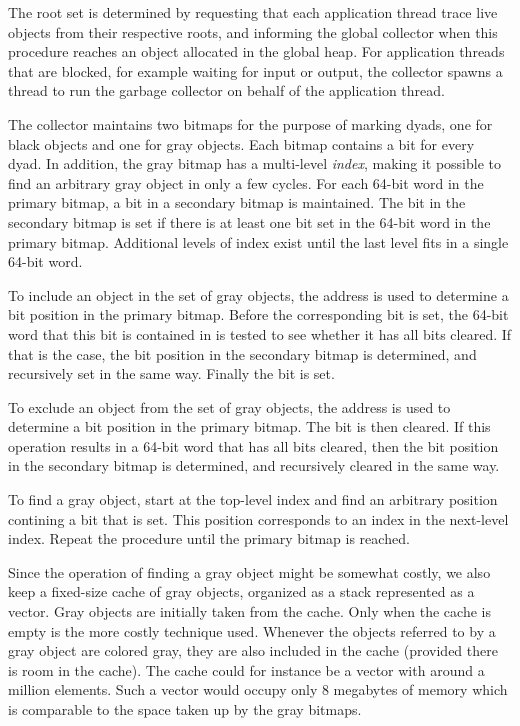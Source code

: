 The root set is determined by requesting that each application thread
trace live objects from their respective roots, and informing the
global collector when this procedure reaches an object allocated in
the global heap. For application threads that are blocked, for example
waiting for input or output, the collector spawns a thread to
run the garbage collector on behalf of the application thread.

The collector maintains two bitmaps for the purpose of marking
dyads, one for black objects and one for gray objects.  Each bitmap
contains a bit for every dyad.  In addition, the gray bitmap has a
multi-level \emph{index}, making it possible to find an arbitrary gray
object in only a few cycles.  For each 64-bit word in the primary
bitmap, a bit in a secondary bitmap is maintained.  The bit in the
secondary bitmap is set if there is at least one bit set in the 64-bit
word in the primary bitmap.  Additional levels of index exist until
the last level fits in a single 64-bit word.

To include an object in the set of gray objects, the address is used
to determine a bit position in the primary bitmap.  Before the
corresponding bit is set, the 64-bit word that this bit is contained
in is tested to see whether it has all bits cleared.  If that is the
case, the bit position in the secondary bitmap is determined, and
recursively set in the same way.  Finally the bit is set.

To exclude an object from the set of gray objects, the address is used
to determine a bit position in the primary bitmap. The bit is then
cleared.  If this operation results in a 64-bit word that has all bits
cleared, then the bit position in the
secondary bitmap is determined, and recursively cleared in the same
way.

To find a gray object, start at the top-level index and find an
arbitrary position contining a bit that is set.  This position
corresponds to an index in the next-level index.  Repeat the procedure
until the primary bitmap is reached.

Since the operation of finding a gray object might be somewhat costly,
we also keep a fixed-size cache of gray objects, organized as a stack
represented as a vector.  Gray objects are initially taken from the
cache.  Only when the cache is empty is the more costly technique
used.  Whenever the objects referred to by a gray object are colored
gray, they are also included in the cache (provided there is room in
the cache).  The cache could for instance be a vector with around a
million elements.  Such a vector would occupy only 8 megabytes of
memory which is comparable to the space taken up by the gray bitmaps.

